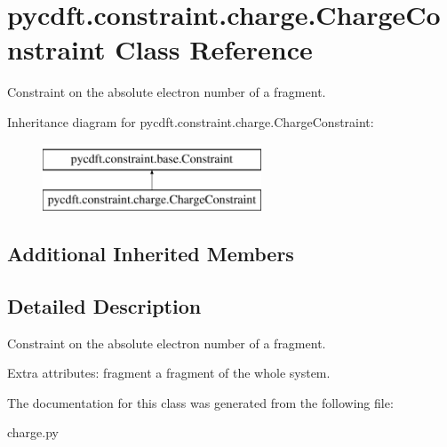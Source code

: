 \hypertarget{classpycdft_1_1constraint_1_1charge_1_1ChargeConstraint}{\section{pycdft.\-constraint.\-charge.\-Charge\-Constraint Class Reference}
\label{classpycdft_1_1constraint_1_1charge_1_1ChargeConstraint}
}


Constraint on the absolute electron number of a fragment.  


Inheritance diagram for pycdft.\-constraint.\-charge.\-Charge\-Constraint\-:\begin{figure}[H]
\begin{center}
\leavevmode
\includegraphics[height=2.000000cm]{classpycdft_1_1constraint_1_1charge_1_1ChargeConstraint}
\end{center}
\end{figure}
\subsection*{Additional Inherited Members}


\subsection{Detailed Description}
Constraint on the absolute electron number of a fragment. 

Extra attributes\-: fragment a fragment of the whole system. 

The documentation for this class was generated from the following file\-:\begin{DoxyCompactItemize}
\item 
charge.\-py\end{DoxyCompactItemize}
